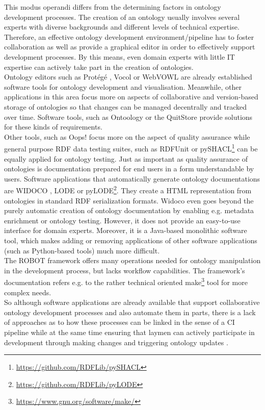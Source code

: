 \documentclass[sigconf]{acmart}
\begin{document}
This modus operandi differs from the determining factors in ontology development processes. The creation of an ontology usually involves several experts with diverse backgrounds and different levels of technical expertise. Therefore, an effective ontology development environment/pipeline has to foster collaboration as well as provide a graphical editor in order to effectively support development processes. By this means, even domain experts with little IT expertise can actively take part in the creation of ontologies.\\
Ontology editors such as Protégé \cite{protege}, Vocol \cite{halilaj} or WebVOWL \cite{lohmann} are already established software tools for ontology development and visualisation. Meanwhile, other applications in this area focus more on aspects of collaborative and version-based storage of ontologies so that changes can be managed decentrally and tracked over time. Software tools, such as Ontoology \cite{alobaid} or the QuitStore \cite{arndt} provide solutions for these kinds of requirements.\\
Other tools, such as Oops! focus more on the aspect of quality assurance \cite{poveda} while general purpose RDF data testing suites, such as RDFUnit \cite{rdfunit} or pySHACL\footnote{\url{https://github.com/RDFLib/pySHACL}} can be equally applied for ontology testing. Just as important as quality assurance of ontologies is documentation prepared for end users in a form understandable by users. Software applications that automatically generate ontology documentations are WIDOCO \cite{widoco}, LODE \cite{lode} or pyLODE\footnote{\url{https://github.com/RDFLib/pyLODE}}. They create a HTML representation from ontologies in standard RDF serialization formats. Widoco even goes beyond the purely automatic creation of ontology documentation by enabling e.g. metadata enrichment or ontology testing. However, it does not provide an easy-to-use interface for domain experts. Moreover, it is a Java-based monolithic software tool, which makes adding or removing applications of other software applications (such as Python-based tools) much more difficult.\\
The ROBOT framework offers many operations needed for ontology manipulation in the development process, but lacks workflow capabilities. The framework's documentation refers e.g. to the rather technical oriented make\footnote{\url{https://www.gnu.org/software/make/}} tool for more complex needs.\\
So although software applications are already available that support collaborative ontology development processes and also automate them in parts, there is a lack of approaches as to how these processes can be linked in the sense of a CI pipeline while at the same time ensuring that laymen can actively participate in development through making changes and triggering ontology updates \cite{mungall}.
\end{document}
